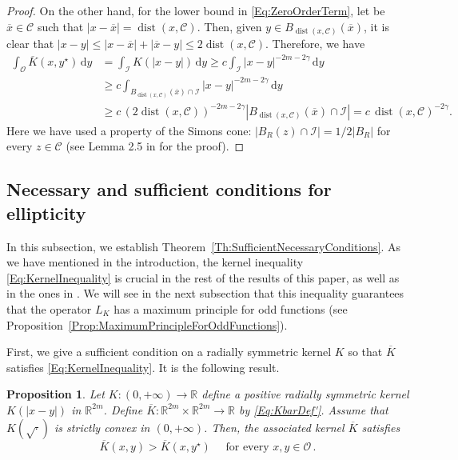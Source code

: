 \documentclass[12pt,reqno]{amsart}
\newtheorem{proposition}[theorem]{Proposition}
\theoremstyle{definition}
\theoremstyle{remark}
\newcommand{\con}[1]{\mathbb{#1}}
\newcommand{\R}{\con{R}} %
\newcommand{\ccal}{\mathscr{C}}
\newcommand{\ical}{\mathcal{I}}
\newcommand{\ocal}{\mathcal{O}}
\newcommand{\s}{\gamma}
\renewcommand{\d}{\,\mathrm{d}} %
\DeclareMathOperator{\dist}{dist}
\numberwithin{equation}{section}
\begin{document}
\begin{proof}
		On the other hand, for the lower bound in \eqref{Eq:ZeroOrderTerm}, let be $\overline{x}\in \ccal$ such that $|x-\overline{x}|=\dist(x,\ccal)$. Then, given $y\in B_{\dist(x,\ccal)}(\overline{x})$, it is clear that $|x-y|\leq |x-\overline{x}|+|\overline{x}-y|\leq 2\dist(x,\ccal)$. Therefore, we have
		\begin{align*}
		\int_{\ocal} \overline{K}(x, y^\star) \d y &=  \int_{\ical} K(|x-y|) \d y \geq c \int_{\ical} |x-y|^{-2m-2\s} \d y \\
		&\geq c \int_{B_{\dist(x,\ccal)}(\overline{x})\cap \ical} |x-y|^{-2m-2\s} \d y\\
		&\geq c \, (2\dist(x,\ccal))^{-2m-2\s} |B_{\dist(x,\ccal)}(\overline{x})\cap \ical| = c \,\dist(x,\ccal)^{-2\s}.
		\end{align*}
		Here we have used a property of the Simons cone: $|B_R(z)\cap \ical|=1/2|B_R|$ for every $z\in \ccal$ (see Lemma 2.5 in \cite{Felipe-Sanz-Perela:SaddleFractional} for the proof).
	\end{proof}
	
	
	\subsection{Necessary and sufficient conditions for ellipticity}
	
	
	
	
	In this subsection, we establish Theorem~\ref{Th:SufficientNecessaryConditions}. As we have mentioned in the introduction, the kernel inequality \eqref{Eq:KernelInequality} is crucial in the rest of the results of this paper, as well as in the ones in \cite{FelipeSanz-Perela:IntegroDifferentialII}. We will see in the next subsection that this inequality guarantees that the operator $L_K$ has a maximum principle for odd functions (see Proposition~\ref{Prop:MaximumPrincipleForOddFunctions}).
	
	First, we give a sufficient condition on a radially symmetric kernel $K$ so that $\overline{K}$ satisfies \eqref{Eq:KernelInequality}. It is the following result.
	
	\begin{proposition}
		\label{Prop:KernelInequalitySufficientCondition} 
		Let $K:(0,+\infty) \to \R$ define a positive radially symmetric kernel $K(|x-y|)$ in $\R^{2m}$. Define $\overline{K} : \R^{2m}\times \R^{2m} \to \R$ by \eqref{Eq:KbarDef'}. Assume that $K(\sqrt{\cdot})$ is strictly convex in $(0,+\infty)$. Then, the associated kernel $\overline{K}$ satisfies
		\begin{equation}
		\label{Eq:KernelInequalityBis}
		\overline{K}(x,y) > \overline{K}(x, y^\star) \quad \text{ for every }x,y \in \ocal\,.
		\end{equation}
	\end{proposition}
	
\end{document}
